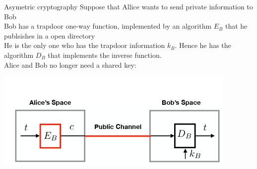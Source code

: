 \begin{parag}{Asymetric cryptography}
    Suppose that Allice wants to send private information to Bob\\
        Bob has a trapdoor one-way function, implemented by an algorithm $E_B$ that he publsishes in a open directory\\
        He is the only one who has the trapdoor information $k_B$. Hence he has the algorithm $D_B$ that implements the inverse function.\\
        Alice and Bob no longer need a shared key:
        \begin{center}
           \includegraphics[scale=0.8]{22025-03-19.png} 
        \end{center}

\end{parag}
